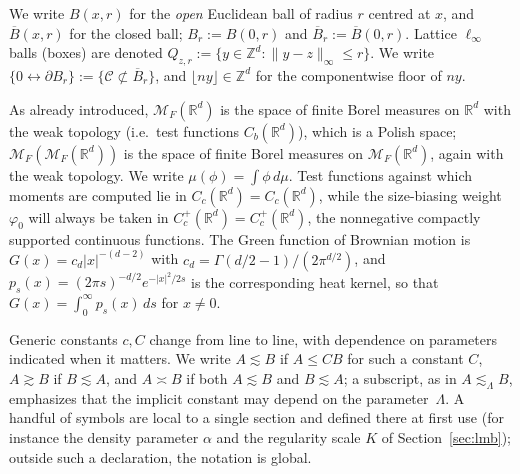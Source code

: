\documentclass[11pt]{article}
\theoremstyle{definition}
\theoremstyle{remark}
\newcommand{\R}{\mathbb{R}}
\newcommand{\Z}{\mathbb{Z}}
\newcommand{\cM}{{\mathcal{M}_F(\R^d)}}          %
\newcommand{\cMM}{{\mathcal{M}_F(\mathcal{M}_F(\R^d))}}
\newcommand{\Cc}{C_c^+(\R^d)}
\newcommand{\Ccg}{C_c(\R^d)}                   %
\newcommand{\fl}[1]{\lfloor #1\rfloor}
\numberwithin{equation}{section}
\theoremstyle{plain}
\theoremstyle{definition}
\theoremstyle{remark}
\theoremstyle{plain}
\begin{document}
We write $B(x,r)$ for the \emph{open} Euclidean ball of radius $r$ centred at
$x$, and $\overline B(x,r)$ for the closed ball; $B_r:=B(0,r)$ and
$\overline B_r:=\overline B(0,r)$. Lattice $\ell_\infty$ balls (boxes) are denoted
$Q_{z,r}:=\{y\in\Z^d:\lVert y-z\rVert_\infty\le r\}$. We write $\{0\leftrightarrow\partial B_r\}:=\{\mathcal C\not\subset\overline B_r\}$, and
$\fl{ny}\in\Z^d$ for the componentwise floor of $ny$.

As already introduced, $\cM$ is the space of finite Borel measures on $\R^d$ with the weak topology
(i.e.\ test functions $C_b(\R^d)$), which is a Polish space; $\cMM$ is the space of finite
Borel measures on $\cM$, again with the weak topology. We write
$\mu(\phi)=\int\phi\,d\mu$. Test functions against which moments are computed
lie in $\Ccg=C_c(\R^d)$, while the size-biasing weight $\varphi_0$ will always be
taken in $\Cc=C_c^+(\R^d)$, the nonnegative compactly supported continuous
functions. The Green
function of Brownian motion is $G(x)=c_d|x|^{-(d-2)}$ with
$c_d=\Gamma(d/2-1)/(2\pi^{d/2})$, and $p_s(x)=(2\pi s)^{-d/2}e^{-|x|^2/2s}$ is
the corresponding heat kernel, so that $G(x)=\int_0^\infty p_s(x)\,ds$ for $x\neq0$.

Generic constants $c,C$ change from line to line, with dependence on
parameters indicated when it matters. We write $A\lesssim B$ if $A\le CB$ for such a constant $C$, $A\gtrsim B$ if $B\lesssim A$, and $A\asymp B$ if both $A\lesssim B$ and $B\lesssim A$; a subscript, as in $A\lesssim_\Lambda B$, emphasizes that the implicit constant may depend on the parameter~$\Lambda$. A handful of symbols are local to a
single section and defined there at first use (for instance the density
parameter $\alpha$ and the regularity scale $K$ of Section~\ref{sec:lmb});
outside such a declaration, the notation is global.
\end{document}
